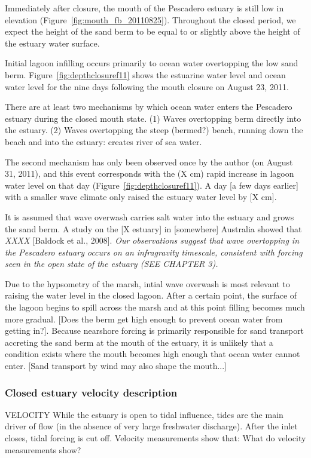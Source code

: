Immediately after closure, the mouth of the Pescadero estuary is still
low in elevation (Figure~\ref{fig:mouth_fb_20110825}). Throughout the closed period, we
expect the height of the sand berm to be equal to or slightly above the
height of the estuary water surface.

Initial lagoon infilling occurs primarily to ocean water overtopping the
low sand berm. Figure~\ref{fig:depthclosuref11} shows the estuarine water level and ocean
water level for the nine days following the mouth closure on August 23, 2011. 

There are at least two mechanisms by which ocean water enters the
Pescadero estuary during the closed mouth state. (1) Waves overtopping
berm directly into the estuary. (2) Waves overtopping the steep
(bermed?) beach, running down the beach and into the estuary: creates
river of sea water.

The second mechanism has only been observed once by the author (on August 31, 2011), and this event corresponds with 
the (X cm) rapid increase in lagoon water level on that day (Figure~\ref{fig:depthclosuref11}). A day
[a few days earlier] with a smaller wave climate only raised the estuary
water level by [X cm].

It is assumed that wave overwash carries salt water into the estuary and
grows the sand berm. A study on the [X estuary] in [somewhere] Australia
showed that \emph{XXXX} [Baldock et al., 2008]. \emph{Our observations suggest that wave overtopping in the Pescadero 
estuary occurs on an infragravity timescale, consistent with forcing seen in the open state of the estuary (SEE CHAPTER 3).}

Due to the hypsometry of the marsh, intial wave overwash is most
relevant to raising the water level in the closed lagoon. After a
certain point, the surface of the lagoon begins to spill across the
marsh and at this point filling becomes much more gradual. [Does the
berm get high enough to prevent ocean water from getting in?]. Because
nearshore forcing is primarily responsible for sand transport accreting
the sand berm at the mouth of the estuary, it is unlikely that a
condition exists where the mouth becomes high enough that ocean water
cannot enter. [Sand transport by wind may also shape the mouth...]

\subsubsection{Closed estuary velocity description} \label{cl_vel}
VELOCITY While the estuary is open to tidal influence, tides are the
main driver of flow (in the absence of very large freshwater discharge).
After the inlet closes, tidal forcing is cut off. Velocity measurements
show that: {What do velocity measurements show?}

